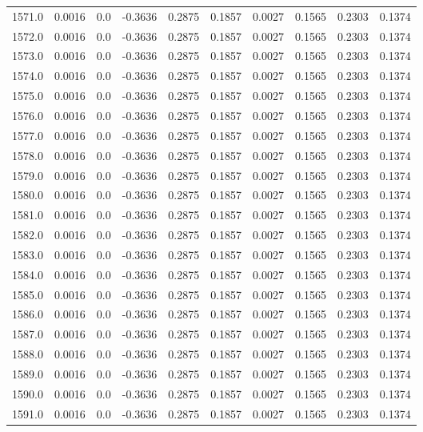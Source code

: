 \begin{longtable}{lrrrrrrrrr}
1571.0 & 0.0016 & 0.0 & -0.3636 & 0.2875 & 0.1857 & 0.0027 & 0.1565 & 0.2303 & 0.1374 \\
1572.0 & 0.0016 & 0.0 & -0.3636 & 0.2875 & 0.1857 & 0.0027 & 0.1565 & 0.2303 & 0.1374 \\
1573.0 & 0.0016 & 0.0 & -0.3636 & 0.2875 & 0.1857 & 0.0027 & 0.1565 & 0.2303 & 0.1374 \\
1574.0 & 0.0016 & 0.0 & -0.3636 & 0.2875 & 0.1857 & 0.0027 & 0.1565 & 0.2303 & 0.1374 \\
1575.0 & 0.0016 & 0.0 & -0.3636 & 0.2875 & 0.1857 & 0.0027 & 0.1565 & 0.2303 & 0.1374 \\
1576.0 & 0.0016 & 0.0 & -0.3636 & 0.2875 & 0.1857 & 0.0027 & 0.1565 & 0.2303 & 0.1374 \\
1577.0 & 0.0016 & 0.0 & -0.3636 & 0.2875 & 0.1857 & 0.0027 & 0.1565 & 0.2303 & 0.1374 \\
1578.0 & 0.0016 & 0.0 & -0.3636 & 0.2875 & 0.1857 & 0.0027 & 0.1565 & 0.2303 & 0.1374 \\
1579.0 & 0.0016 & 0.0 & -0.3636 & 0.2875 & 0.1857 & 0.0027 & 0.1565 & 0.2303 & 0.1374 \\
1580.0 & 0.0016 & 0.0 & -0.3636 & 0.2875 & 0.1857 & 0.0027 & 0.1565 & 0.2303 & 0.1374 \\
1581.0 & 0.0016 & 0.0 & -0.3636 & 0.2875 & 0.1857 & 0.0027 & 0.1565 & 0.2303 & 0.1374 \\
1582.0 & 0.0016 & 0.0 & -0.3636 & 0.2875 & 0.1857 & 0.0027 & 0.1565 & 0.2303 & 0.1374 \\
1583.0 & 0.0016 & 0.0 & -0.3636 & 0.2875 & 0.1857 & 0.0027 & 0.1565 & 0.2303 & 0.1374 \\
1584.0 & 0.0016 & 0.0 & -0.3636 & 0.2875 & 0.1857 & 0.0027 & 0.1565 & 0.2303 & 0.1374 \\
1585.0 & 0.0016 & 0.0 & -0.3636 & 0.2875 & 0.1857 & 0.0027 & 0.1565 & 0.2303 & 0.1374 \\
1586.0 & 0.0016 & 0.0 & -0.3636 & 0.2875 & 0.1857 & 0.0027 & 0.1565 & 0.2303 & 0.1374 \\
1587.0 & 0.0016 & 0.0 & -0.3636 & 0.2875 & 0.1857 & 0.0027 & 0.1565 & 0.2303 & 0.1374 \\
1588.0 & 0.0016 & 0.0 & -0.3636 & 0.2875 & 0.1857 & 0.0027 & 0.1565 & 0.2303 & 0.1374 \\
1589.0 & 0.0016 & 0.0 & -0.3636 & 0.2875 & 0.1857 & 0.0027 & 0.1565 & 0.2303 & 0.1374 \\
1590.0 & 0.0016 & 0.0 & -0.3636 & 0.2875 & 0.1857 & 0.0027 & 0.1565 & 0.2303 & 0.1374 \\
1591.0 & 0.0016 & 0.0 & -0.3636 & 0.2875 & 0.1857 & 0.0027 & 0.1565 & 0.2303 & 0.1374 \\

\end{longtable}
